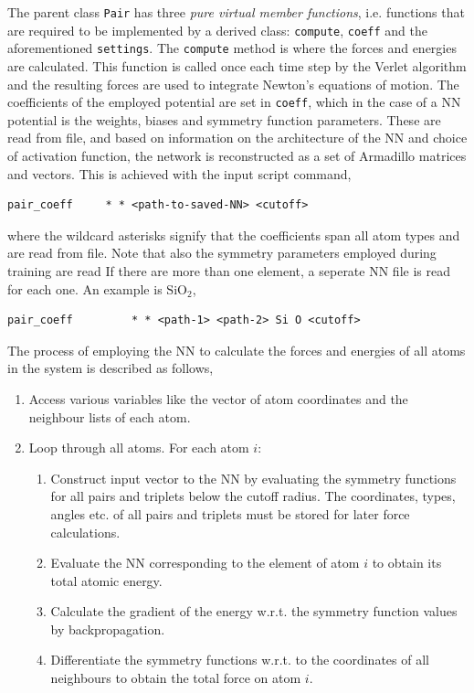 \documentclass[twoside,english]{uiofysmaster}
\begin{document}
The parent class \texttt{Pair} has three \textit{pure virtual member functions}, i.e. functions that are required
to be implemented by a derived class: \texttt{compute}, \texttt{coeff} and the aforementioned \texttt{settings}. 
The \texttt{compute} method is where the forces and energies are calculated. This function is called
once each time step by the Verlet algorithm and the resulting forces are used to integrate Newton's equations
of motion. The coefficients of the employed potential are set in \texttt{coeff}, which in the case of a NN potential
is the weights, biases and symmetry function parameters. 
These are read from file, and based on information on the architecture of the NN and 
choice of activation function, the network is reconstructed as a set of Armadillo matrices and 
vectors. This is achieved with the input script command,
\begin{lstlisting}[style=lammps]
 pair_coeff		* * <path-to-saved-NN> <cutoff> 
\end{lstlisting}
where the wildcard asterisks signify that the coefficients span all atom types and are read from file. 
Note that also the symmetry parameters employed during training are read 
If there are more than one element, a seperate NN file is read for each one. 
An example is $\mathrm{SiO}_2$,
\begin{lstlisting}[style=lammps]
 pair_coeff 		* * <path-1> <path-2> Si O <cutoff>
\end{lstlisting}
The process of employing the NN to calculate the forces and energies of all atoms in the system 
is described as follows,
\begin{enumerate}
 \item Access various variables like the vector of atom coordinates and the neighbour lists of each atom.
 \item Loop through all atoms. For each atom $i$:
 \begin{enumerate}
  \item Construct input vector to the NN by evaluating the symmetry functions for all pairs and triplets below the cutoff radius. 
	The coordinates, types, angles etc. of all pairs and triplets must be stored for later force calculations. 
  \item Evaluate the NN corresponding to the element of atom $i$ to obtain its total atomic energy.
  \item Calculate the gradient of the energy w.r.t. the symmetry function values by backpropagation.
  \item Differentiate the symmetry functions w.r.t. to the coordinates of all neighbours to obtain the total force on atom $i$.
 \end{enumerate}
\end{enumerate}
\end{document}
